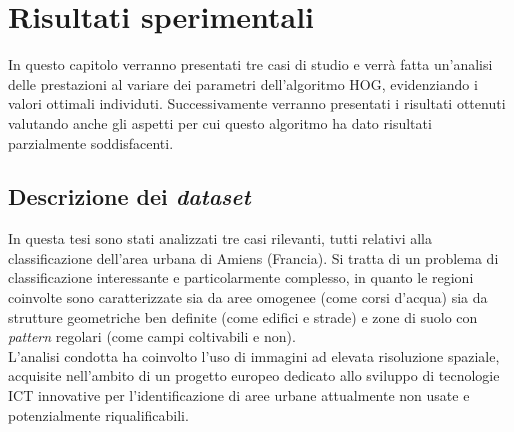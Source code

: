 \chapter{Risultati sperimentali} %

\label{cap:risultati} %



In questo capitolo verranno presentati tre casi di studio e verrà fatta un'analisi delle prestazioni al variare dei parametri dell’algoritmo  HOG, evidenziando i valori ottimali individuti. 
Successivamente verranno presentati i risultati ottenuti valutando anche gli aspetti per cui questo algoritmo ha dato risultati parzialmente soddisfacenti.

\clearpage

\section{Descrizione dei \emph{dataset}}
In questa tesi sono stati analizzati tre casi rilevanti, tutti relativi alla classificazione dell'area urbana di Amiens (Francia).  Si tratta di un problema di classificazione interessante e particolarmente complesso, in quanto le regioni coinvolte sono caratterizzate sia da aree omogenee (come corsi d'acqua) sia da strutture geometriche ben definite (come edifici e strade) e zone di suolo con\emph{ pattern} regolari (come campi coltivabili e non).\\
L'analisi condotta ha coinvolto l'uso di immagini ad elevata risoluzione spaziale, acquisite nell'ambito di un progetto europeo dedicato allo sviluppo di tecnologie ICT innovative per l'identificazione di aree urbane attualmente non usate e potenzialmente riqualificabili.\\

